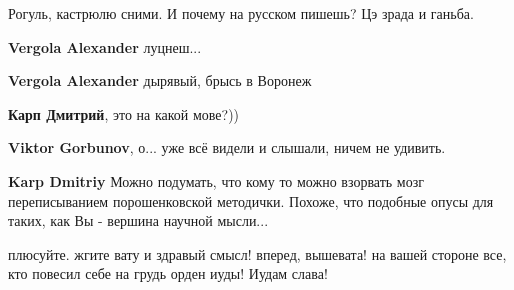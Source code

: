 \begin{itemize}
\begin{itemize}
Рогуль, кастрюлю сними. И почему на русском пишешь? Цэ зрада и ганьба.

 

\textbf{Vergola Alexander} луцнеш...

 
\textbf{Vergola Alexander} дырявый, брысь в Воронеж

 
\textbf{Карп Дмитрий}, это на какой мове?))

 
\textbf{Viktor Gorbunov}, о... уже всё видели и слышали, ничем не удивить.

 
\textbf{Karp Dmitriy} Можно подумать, что кому то можно взорвать мозг переписыванием порошенковской методички. Похоже, что подобные опусы для таких, как Вы - вершина научной мысли...

 
плюсуйте. жгите вату и здравый смысл! вперед, вышевата! на вашей стороне все, кто повесил себе на грудь орден иуды! Иудам слава!

 


\end{itemize}
\end{itemize}
